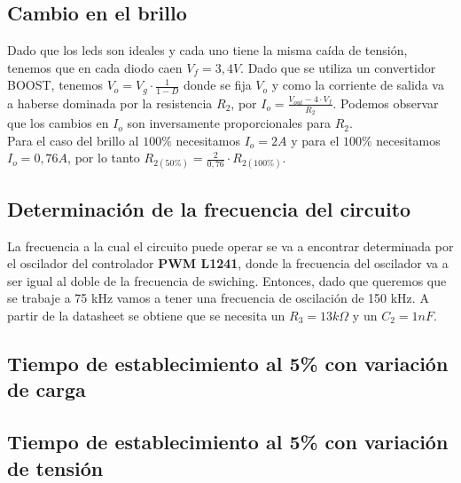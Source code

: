 \documentclass[e4-tp2-main.tex]{subfiles}
\begin{document}
\subsection{Cambio en el brillo}

Dado que los leds son ideales y cada uno tiene la misma caída de tensión, tenemos que en cada diodo caen $V_f=3,4V$. Dado que se utiliza un convertidor BOOST, tenemos $V_o=V_g\cdot\frac{1}{1-D}$ donde se fija $V_o$ y como la corriente de salida va a haberse dominada por la resistencia $R_2$, por $I_o=\frac{V_{out}-4\cdot V_f}{R_2}$. Podemos observar que los cambios en $I_o$ son inversamente proporcionales para $R_2$.\\
Para el caso del brillo al $100\%$ necesitamos $I_o=2A$ y para el $100\%$ necesitamos $I_o=0,76 A$, por lo tanto $R_{2(50\%)}=\frac{2}{0,76}\cdot R_{2(100\%)}$.\\

\subsection{Determinación de la frecuencia del circuito}

La frecuencia a la cual el circuito puede operar se va a encontrar determinada por el oscilador del controlador \textbf{PWM L1241}, donde la frecuencia del oscilador va a ser igual al doble de la frecuencia de swiching. Entonces, dado que queremos que se trabaje a 75 kHz vamos a tener una frecuencia de oscilación de 150 kHz. A partir de la datasheet se obtiene que se necesita un $R_3=13 k\Omega$ y un $C_2=1 nF$.\\

\subsection{Tiempo de establecimiento al 5\% con variación de carga}

\subsection{Tiempo de establecimiento al 5\% con variación de tensión}
\end{document}

